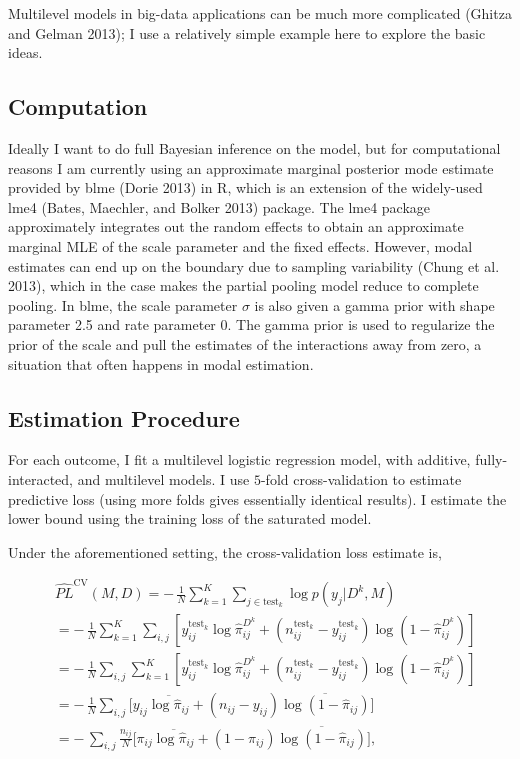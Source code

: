 Multilevel models in big-data applications can be much more complicated
(Ghitza and Gelman 2013); I use a relatively simple example here to
explore the basic ideas.

\subsection{Computation}\label{computation}

Ideally I want to do full Bayesian inference on the model, but for
computational reasons I am currently using an approximate marginal
posterior mode estimate provided by blme (Dorie 2013) in R, which is an
extension of the widely-used lme4 (Bates, Maechler, and Bolker 2013)
package. The lme4 package approximately integrates out the random
effects to obtain an approximate marginal MLE of the scale parameter and
the fixed effects. However, modal estimates can end up on the boundary
due to sampling variability (Chung et al. 2013), which in the case makes
the partial pooling model reduce to complete pooling. In blme, the scale
parameter \(\sigma\) is also given a gamma prior with shape parameter
2.5 and rate parameter 0. The gamma prior is used to regularize the
prior of the scale and pull the estimates of the interactions away from
zero, a situation that often happens in modal estimation.

\subsection{Estimation Procedure}\label{estimation-procedure}

For each outcome, I fit a multilevel logistic regression model, with
additive, fully-interacted, and multilevel models. I use \(5\)-fold
cross-validation to estimate predictive loss (using more folds gives
essentially identical results). I estimate the lower bound using the
training loss of the saturated model.

Under the aforementioned setting, the cross-validation loss estimate is,

\begin{align*}
  \label{eq:CV4MultiWaySurvey}
  &\widehat{PL}^{\text{CV}}(M, D) =-\,\frac{1}{N}\sum_{k=1}^K\sum_{j\in \text{test}_k}\log p(y_j|D^k, M)\\
  & = -\,\frac{1}{N}\sum_{k=1}^K\sum_{i,j} [y^{\text{test}_k}_{ij}\log\hat\pi_{ij}^{D^k}+(n^{\text{test}_k}_{ij}- y^{\text{test}_k}_{ij})\log(1-\hat\pi_{ij}^{D^k})]\\
  & = -\,\frac{1}{N}\sum_{i,j}\sum_{k=1}^K[ y^{\text{test}_k}_{ij}\log\hat\pi_{ij}^{D^k}+(n^{\text{test}_k}_{ij}- y^{\text{test}_k}_{ij})\log(1-\hat\pi_{ij}^{D^k})]\\
  & = -\,\frac{1}{N}\sum_{i,j}\big[y_{ij}\overline{\log\hat{\pi}_{ij}} +(n_{ij}- y_{ij})\overline{\log(1-\hat\pi_{ij})}\big]\\
  & = -\,\sum_{i,j}\frac{n_{ij}}{N}\big[\pi_{ij}\overline{\log\hat\pi_{ij}} +(1- \pi_{ij})\overline{\log(1-\hat\pi_{ij})}\big],
\end{align*}

